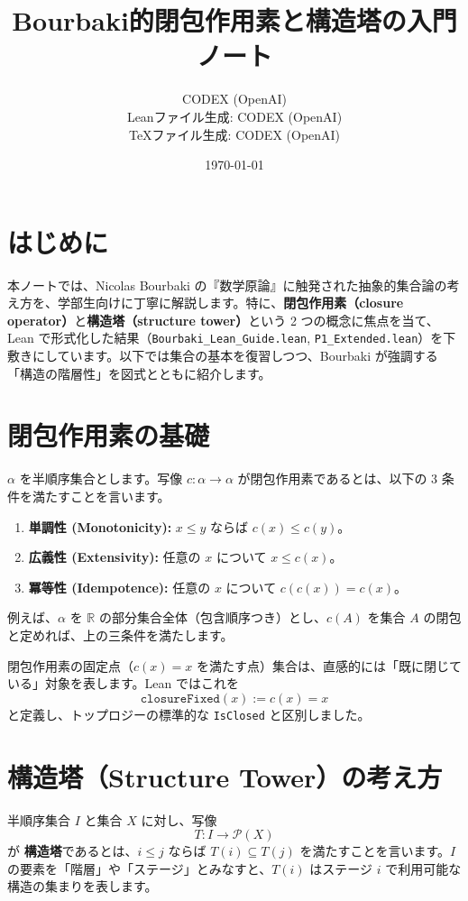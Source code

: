 \documentclass[12pt]{ltjsarticle}
\title{Bourbaki的閉包作用素と構造塔の入門ノート}
\author{CODEX (OpenAI)\\Leanファイル生成: CODEX (OpenAI)\\TeXファイル生成: CODEX (OpenAI)}
\date{\today}
\begin{document}
\maketitle

\section*{はじめに}

本ノートでは、Nicolas Bourbaki の『数学原論』に触発された抽象的集合論の考え方を、学部生向けに丁寧に解説します。特に、\textbf{閉包作用素（closure operator）}と\textbf{構造塔（structure tower）}という 2 つの概念に焦点を当て、Lean で形式化した結果（\texttt{Bourbaki\_Lean\_Guide.lean}, \texttt{P1\_Extended.lean}）を下敷きにしています。以下では集合の基本を復習しつつ、Bourbaki が強調する「構造の階層性」を図式とともに紹介します。

\section{閉包作用素の基礎}

\begin{definition}
  $\alpha$ を半順序集合とします。写像 $c \colon \alpha \to \alpha$ が閉包作用素であるとは、以下の 3 条件を満たすことを言います。
  \begin{enumerate}[label=(\roman*)]
    \item \textbf{単調性 (Monotonicity):} $x \le y$ ならば $c(x) \le c(y)$。
    \item \textbf{広義性 (Extensivity):} 任意の $x$ について $x \le c(x)$。
    \item \textbf{冪等性 (Idempotence):} 任意の $x$ について $c(c(x)) = c(x)$。
  \end{enumerate}
\end{definition}

\noindent
例えば、$\alpha$ を $\mathbb{R}$ の部分集合全体（包含順序つき）とし、$c(A)$ を集合 $A$ の閉包と定めれば、上の三条件を満たします。

閉包作用素の固定点（$c(x) = x$ を満たす点）集合は、直感的には「既に閉じている」対象を表します。Lean ではこれを
\[
  \texttt{closureFixed}(x) := c(x) = x
\]
と定義し、トップロジーの標準的な \texttt{IsClosed} と区別しました。

\section{構造塔（Structure Tower）の考え方}

\begin{definition}
  半順序集合 $I$ と集合 $X$ に対し、写像
  \[
  T \colon I \to \mathcal{P}(X)
  \]
  が \textbf{構造塔}であるとは、$i \le j$ ならば $T(i) \subseteq T(j)$ を満たすことを言います。$I$ の要素を「階層」や「ステージ」とみなすと、$T(i)$ はステージ $i$ で利用可能な構造の集まりを表します。
\end{definition}
\end{document}
